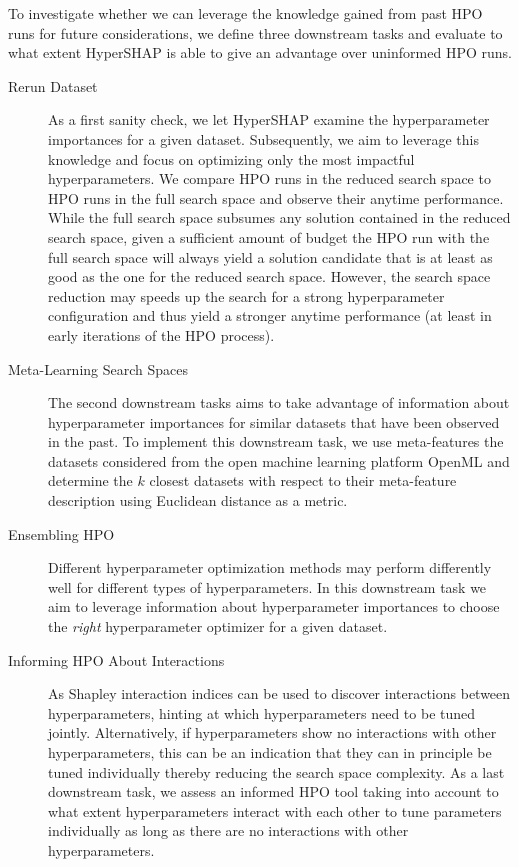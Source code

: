 To investigate whether we can leverage the knowledge gained from past HPO runs for future considerations, we define three downstream tasks and evaluate to what extent HyperSHAP is able to give an advantage over uninformed HPO runs.
\begin{description}
    \item[Rerun Dataset] As a first sanity check, we let HyperSHAP examine the hyperparameter importances for a given dataset. Subsequently, we aim to leverage this knowledge and focus on optimizing only the most impactful hyperparameters.
    We compare HPO runs in the reduced search space to HPO runs in the full search space and observe their anytime performance. While the full search space subsumes any solution contained in the reduced search space, given a sufficient amount of budget
    the HPO run with the full search space will always yield a solution candidate that is at least as good as the one for the reduced search space. However, the search space reduction may speeds up the search for a strong hyperparameter configuration
    and thus yield a stronger anytime performance (at least in early iterations of the HPO process).
    \item[Meta-Learning Search Spaces] The second downstream tasks aims to take advantage of information about hyperparameter importances for similar datasets that have been observed in the past. To implement this downstream task, we use meta-features
    the datasets considered from the open machine learning platform OpenML \citep{} and determine the $k$ closest datasets with respect to their meta-feature description using Euclidean distance as a metric.
    \item[Ensembling HPO] Different hyperparameter optimization methods may perform differently well for different types of hyperparameters. In this downstream task we aim to leverage information about hyperparameter importances to choose the \textit{right}
    hyperparameter optimizer for a given dataset.
    \item[Informing HPO About Interactions] As Shapley interaction indices can be used to discover interactions between hyperparameters,
    hinting at which hyperparameters need to be tuned jointly. Alternatively, if hyperparameters show no interactions
    with other hyperparameters, this can be an indication that they can in principle be tuned individually thereby
    reducing the search space complexity. As a last downstream task, we assess an informed HPO tool taking into account
    to what extent hyperparameters interact with each other to tune parameters individually as long as there are no
    interactions with other hyperparameters.
\end{description}